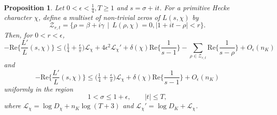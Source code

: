 \documentclass[12pt,psamsfonts]{amsart}
\newtheorem{prop}[thm]{Proposition}
\theoremstyle{definition}
\theoremstyle{remark}
\numberwithin{equation}{section}
\theoremstyle{plain}
\theoremstyle{remark}
\renewcommand{\1}{ {\bf 1}}
\newcommand{\cL}{\mathcal{L}}
\renewcommand{\Re}{\mathrm{Re}}
\newcommand{\cZ}{\mathcal{Z}}
\begin{document}
\begin{prop} \label{ExplicitInequality-Convexity} Let  $0 < \epsilon < \tfrac{1}{4}, T  \geq 1$ and $s = \sigma+it$. For a primitive Hecke character $\chi$, define a multiset of non-trivial zeros of $L(s,\chi)$ by
\[
\cZ_{r, t} = \{ \rho = \beta+i\gamma \, \mid \, L(\rho, \chi) = 0,  |1+it - \rho| < r \}. 
\]
Then, for $0 < r < \epsilon$, 
\begin{equation}
 - \Re\Big\{ \frac{L'}{L}(s,\chi) \Big\}  \leq \big( \tfrac{1}{4} + \tfrac{\epsilon}{\pi} \big)\cL_{\chi} + 4 \epsilon^2 \cL_{\chi}' + \delta(\chi)  \Re\Big\{ \frac{1}{s-1} \Big\}   - \sum_{\rho \in \cZ_{r,t} }  \Re\Big\{\frac{1}{s-\rho} \Big\}  + O_{\epsilon}(n_K)
\label{eqn:EI_1}
\end{equation}
and
\begin{equation}
 - \Re\Big\{ \frac{L'}{L}(s,\chi) \Big\}  \leq \big( \tfrac{1}{4} + \tfrac{\epsilon}{\pi} \big)\cL_{\chi}   + \delta(\chi)  \Re\Big\{ \frac{1}{s-1} \Big\} + O_{\epsilon}(n_K)
\label{eqn:EI_2}
\end{equation}
uniformly in the region
\[
1 < \sigma \leq 1 + \epsilon, \qquad |t| \leq T,
\]
where $\cL_{\chi} = \log D_{\chi} + n_K \log(T+3)$ and $\cL_{\chi}' = \log D_K + \cL_{\chi}$. 
\end{prop}
\end{document}
